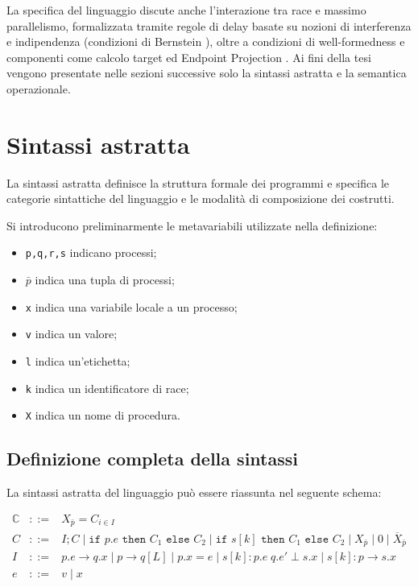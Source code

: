 La specifica del linguaggio \cite{racingdraft} discute anche l’interazione tra race e massimo parallelismo, formalizzata tramite regole di delay basate su nozioni di interferenza e indipendenza (condizioni di Bernstein \cite{bernstein1966parallel}), oltre a condizioni di well-formedness \cite{montesi2023choreographies} e componenti come calcolo target ed Endpoint Projection \cite{honda2008multiparty,montesi2023choreographies}. Ai fini della tesi vengono presentate nelle sezioni successive solo la sintassi astratta e la semantica operazionale.
\section{Sintassi astratta}

La sintassi astratta definisce la struttura formale dei programmi e specifica le categorie sintattiche del linguaggio e le modalità di composizione dei costrutti.

Si introducono preliminarmente le metavariabili utilizzate nella definizione:

\begin{itemize}
\item \texttt{p,q,r,s} indicano processi;
\item $\bar{p}$ indica una tupla di processi;
\item \texttt{x} indica una variabile locale a un processo;
\item \texttt{v} indica un valore;
\item \texttt{l} indica un’etichetta;
\item \texttt{k} indica un identificatore di race;
\item \texttt{X} indica un nome di procedura.
\end{itemize}

\subsection*{Definizione completa della sintassi}

La sintassi astratta del linguaggio può essere riassunta nel seguente schema:

\[
\begin{array}{lcl}
\mathbb{C} & ::= & X_{\bar{p}} = C_{i \in I} \\[4pt]

C & ::= & I ; C 
\mid \texttt{if } p.e \texttt{ then } C_{1} \texttt{ else } C_{2}
\mid \texttt{if } s[k] \texttt{ then } C_{1} \texttt{ else } C_{2}
\mid X_{\bar{p}}
\mid 0
\mid \overline{X}_{\bar{p}} \\[4pt]

I & ::= & p.e \rightarrow q.x
\mid p \rightarrow q[L]
\mid p.x = e
\mid s[k] : p.e \; q.e' \perp s.x
\mid s[k] : p \rightarrow s.x \\[4pt]

e & ::= & v \mid x
\end{array}
\]

